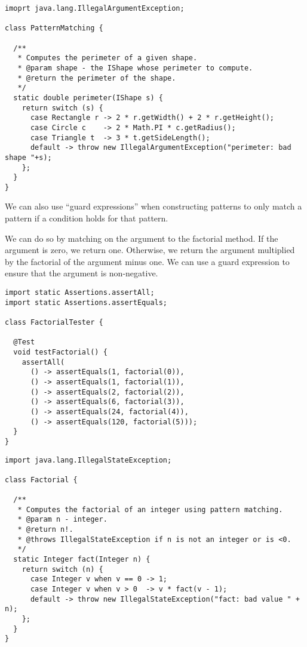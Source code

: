 \begin{lstlisting}[language=MyJava]
imoprt java.lang.IllegalArgumentException;

class PatternMatching {

  /**
   * Computes the perimeter of a given shape.
   * @param shape - the IShape whose perimeter to compute.
   * @return the perimeter of the shape.
   */
  static double perimeter(IShape s) {
    return switch (s) {
      case Rectangle r -> 2 * r.getWidth() + 2 * r.getHeight();
      case Circle c    -> 2 * Math.PI * c.getRadius();
      case Triangle t  -> 3 * t.getSideLength();
      default -> throw new IllegalArgumentException("perimeter: bad shape "+s);
    };
  }
}
\end{lstlisting}

We can also use ``guard expressions'' when constructing patterns to only match a pattern if a condition holds for that pattern.

We can do so by matching on the argument to the factorial method. 
If the argument is zero, we return one.
Otherwise, we return the argument multiplied by the factorial of the argument minus one. 
We can use a guard expression to ensure that the argument is non-negative.

\begin{lstlisting}[language=MyJava]
import static Assertions.assertAll;
import static Assertions.assertEquals;

class FactorialTester {

  @Test
  void testFactorial() {
    assertAll(
      () -> assertEquals(1, factorial(0)),
      () -> assertEquals(1, factorial(1)),
      () -> assertEquals(2, factorial(2)),
      () -> assertEquals(6, factorial(3)),
      () -> assertEquals(24, factorial(4)),
      () -> assertEquals(120, factorial(5)));
  }
}
\end{lstlisting}

\begin{lstlisting}[language=MyJava]
import java.lang.IllegalStateException;

class Factorial {

  /**
   * Computes the factorial of an integer using pattern matching.
   * @param n - integer.
   * @return n!.
   * @throws IllegalStateException if n is not an integer or is <0.
   */
  static Integer fact(Integer n) {
    return switch (n) {
      case Integer v when v == 0 -> 1;
      case Integer v when v > 0  -> v * fact(v - 1);
      default -> throw new IllegalStateException("fact: bad value " + n);
    };
  }
}
\end{lstlisting}

